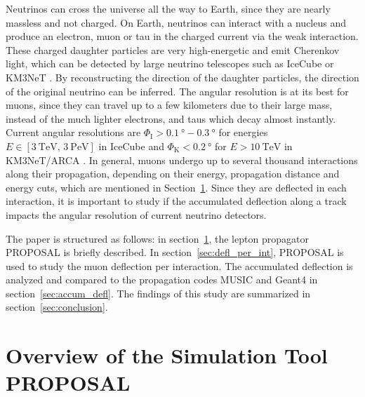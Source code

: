 \documentclass[pdflatex, sn-mathphys]{sn-jnl}%
\theoremstyle{thmstyleone}%
\theoremstyle{thmstyletwo}%
\theoremstyle{thmstylethree}%
\begin{document}
Neutrinos can cross the universe all the way to Earth, since they are 
nearly massless and not charged. On Earth, neutrinos can interact 
with a nucleus and produce an electron, muon or tau in the charged current 
via the weak interaction. These charged daughter particles are very 
high-energetic and emit Cherenkov light, which can be detected 
by large neutrino telescopes such as IceCube \cite{IceCube_Instrumentation} or 
KM3NeT \cite{KM3NeT_Design}. 
By reconstructing the direction of the daughter particles, the direction 
of the original neutrino can be inferred. The angular resolution is at its 
best for muons, since they can travel up to a few kilometers due to their 
large mass, instead of the much lighter electrons, and taus which decay almost 
instantly. Current angular resolutions are 
$\Phi_{\text{I}} > \SI{0.1}{\degree} - \SI{0.3}{\degree}$ for energies 
$E \in [\SI{3}{\tera\electronvolt},\,\SI{3}{\peta\electronvolt}]$ in IceCube 
\cite{IceCube_Resolution2021} 
and 
$\Phi_{\text{K}} < \SI{0.2}{\degree}$ for $E > \SI{10}{\tera\electronvolt}$ in 
KM3NeT/ARCA \cite{KM3NeT_Resolution2021}.
In general, muons undergo up to several thousand interactions along their propagation, depending 
on their energy, propagation distance and energy cuts, which are mentioned in 
Section~\ref{sec:proposal}.
Since they 
are deflected in each interaction, it is important to study if the accumulated 
deflection along a track impacts the angular resolution of current 
neutrino detectors. 

The paper is structured as follows: in section~\ref{sec:proposal},
the lepton propagator PROPOSAL is briefly described. In section~\ref{sec:defl_per_int},
PROPOSAL is used to study the muon deflection per interaction.
The accumulated deflection is analyzed and compared to the propagation codes
MUSIC and Geant4 in section~\ref{sec:accum_defl}. The findings of this study
are summarized in section~\ref{sec:conclusion}.

\section{Overview of the Simulation Tool PROPOSAL}\label{sec:proposal}
\end{document}
